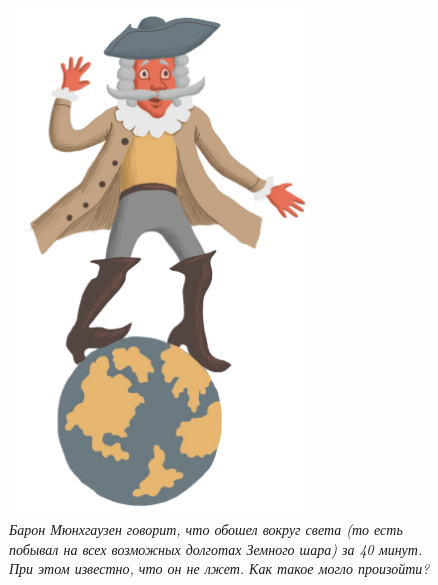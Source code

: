 \documentclass[10pt]{scrbook} \usepackage{modules/nonstahp_book}
\begin{document}
\begin{figure} \begin{center}
	\includegraphics[width=8cm]{figures/color/12c.jpg}
	\vspace{1cm}
	\caption{
             {\itshape  Барон Мюнхгаузен говорит, что обошел вокруг света (то есть побывал на 
              всех возможных долготах Земного шара) за 40 минут. При этом известно, что он не лжет. 
              Как такое могло произойти? }\medskip\\
             \\
             }
\end{center} \end{figure}
\end{document}
